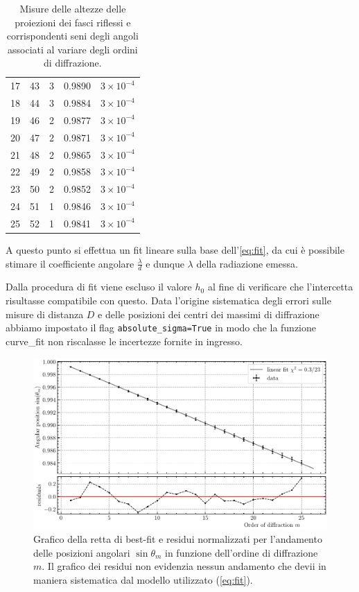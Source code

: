 \documentclass[10pt, a4paper, italian]{article}
\begin{document}
\begin{table}[htbp]
\begin{tabular}{ccccc}
17 & 43 & 3 & 0.9890 & $3 \times 10^{-4}$ \\
18 & 44 & 3 & 0.9884 & $3 \times 10^{-4}$ \\
19 & 46 & 2 & 0.9877 & $3 \times 10^{-4}$ \\
20 & 47 & 2 & 0.9871 & $3 \times 10^{-4}$ \\
21 & 48 & 2 & 0.9865 & $3 \times 10^{-4}$ \\
22 & 49 & 2 & 0.9858 & $3 \times 10^{-4}$ \\
23 & 50 & 2 & 0.9852 & $3 \times 10^{-4}$ \\
24 & 51 & 1 & 0.9846 & $3 \times 10^{-4}$ \\
25 & 52 & 1 & 0.9841 & $3 \times 10^{-4}$ \\
\bottomrule
\end{tabular}
\caption{Misure delle altezze delle proiezioni dei fasci riflessi e
corrispondenti seni degli angoli associati al variare degli ordini di
diffrazione. \label{tab: hm}}
\end{table}

A questo punto si effettua un fit lineare sulla base dell'\cref{eq:fit},
da cui è possibile stimare il coefficiente angolare $\frac{\lambda}{d}$ e
dunque $\lambda$ della radiazione emessa.

Dalla procedura di fit viene escluso il valore $h_0$ al fine di verificare che
l'intercetta risultasse compatibile con questo.
Data l'origine sistematica degli errori sulle misure di distanza $D$ e delle
posizioni dei centri dei massimi di diffrazione abbiamo impostato il flag
\verb+absolute_sigma=True+ in modo che la funzione curve\_fit non riscalasse
le incertezze fornite in ingresso.
\begin{figure}
\includegraphics[width=\textwidth]{thetafit}
\caption{Grafico della retta di best-fit e residui normalizzati per
l'andamento delle posizioni angolari $\sin{\theta_m}$ in funzione dell'ordine
di diffrazione $m$. Il grafico dei residui non evidenzia nessun andamento
che devii in maniera sistematica dal modello utilizzato (\cref{eq:fit}).
\label{fig: linfit}}
\end{figure}
\end{document}
